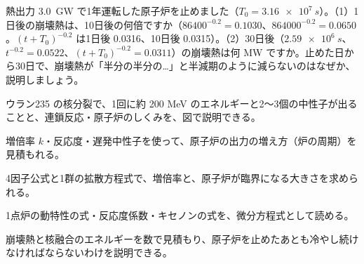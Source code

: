 \bkproblem 熱出力 \qty{3.0}{GW} で1年運転した原子炉を止めました（$T_0=\qty{3.16e7}{s}$）。（1）1日後の崩壊熱は、10日後の何倍ですか（$\num{86400}^{-0.2}=0.1030$、$\num{864000}^{-0.2}=0.0650$。$(t+T_0)^{-0.2}$ は1日後 0.0316、10日後 0.0315）。（2）30日後（$\qty{2.59e6}{s}$、$t^{-0.2}=0.0522$、$(t+T_0)^{-0.2}=0.0311$）の崩壊熱は何 MW ですか。止めた日から30日で、崩壊熱が「半分の半分の…」と半減期のように減らないのはなぜか、説明しましょう。

\begin{furikaeri}
\begin{checklist}
\item ウラン235 の核分裂で、1回に約 200 MeV のエネルギーと2〜3個の中性子が出ることと、連鎖反応・原子炉のしくみを、図で説明できる。
\item 増倍率 $k$・反応度・遅発中性子を使って、原子炉の出力の増え方（炉の周期）を見積もれる。
\item 4因子公式と1群の拡散方程式で、増倍率と、原子炉が臨界になる大きさを求められる。
\item 1点炉の動特性の式・反応度係数・キセノンの式を、微分方程式として読める。
\item 崩壊熱と核融合のエネルギーを数で見積もり、原子炉を止めたあとも冷やし続けなければならないわけを説明できる。
\end{checklist}
\end{furikaeri}
